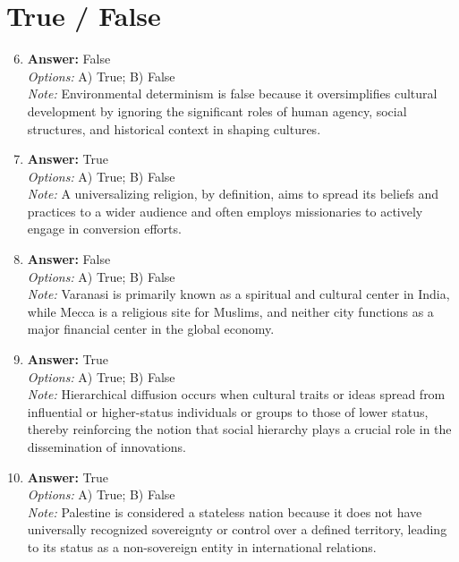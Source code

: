 \documentclass[12pt]{article}
\begin{document}
\section*{True / False}
\begin{enumerate}[label=\arabic*.]
\setcounter{enumi}{5}
\item \textbf{Answer:} False
\\ \textit{Options:} A) True; B) False
\\ \textit{Note:} Environmental determinism is false because it oversimplifies cultural development by ignoring the significant roles of human agency, social structures, and historical context in shaping cultures.
\item \textbf{Answer:} True
\\ \textit{Options:} A) True; B) False
\\ \textit{Note:} A universalizing religion, by definition, aims to spread its beliefs and practices to a wider audience and often employs missionaries to actively engage in conversion efforts.
\item \textbf{Answer:} False
\\ \textit{Options:} A) True; B) False
\\ \textit{Note:} Varanasi is primarily known as a spiritual and cultural center in India, while Mecca is a religious site for Muslims, and neither city functions as a major financial center in the global economy.
\item \textbf{Answer:} True
\\ \textit{Options:} A) True; B) False
\\ \textit{Note:} Hierarchical diffusion occurs when cultural traits or ideas spread from influential or higher-status individuals or groups to those of lower status, thereby reinforcing the notion that social hierarchy plays a crucial role in the dissemination of innovations.
\item \textbf{Answer:} True
\\ \textit{Options:} A) True; B) False
\\ \textit{Note:} Palestine is considered a stateless nation because it does not have universally recognized sovereignty or control over a defined territory, leading to its status as a non-sovereign entity in international relations.
\end{enumerate}
\end{document}
